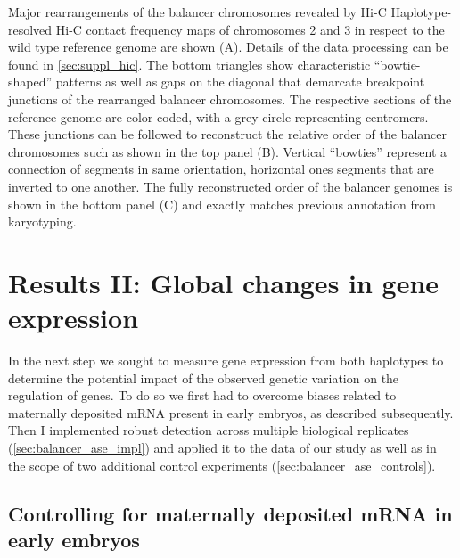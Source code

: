     {Major rearrangements of the balancer chromosomes revealed by Hi-C}{
    Haplotype-resolved Hi-C contact frequency maps of chromosomes 2 and 3 in
    respect to the wild type reference genome are shown (A). Details of the data
    processing can be found in \cref{sec:suppl_hic}. The bottom triangles show
    characteristic ``bowtie-shaped'' patterns as well as gaps on the diagonal
    that demarcate breakpoint junctions of the rearranged balancer chromosomes.
    The respective sections of the reference genome are color-coded, with a grey
    circle representing centromers.
    These junctions can be followed to reconstruct the relative order of the
    balancer chromosomes such as shown in the top panel (B). Vertical ``bowties''
    represent a connection of segments in same orientation, horizontal
    ones segments that are inverted to one another.
    The fully reconstructed order of the balancer genomes is shown in the bottom
    panel (C) and exactly matches previous annotation from
    karyotyping.}
\FloatBarrier












\section{Results II: Global changes in gene expression}
\label{sec:balancer_ase}

In the next step we sought to measure gene expression from both haplotypes to
determine the potential impact of the observed genetic variation on the
regulation of genes. To do so we first had to overcome biases related to
maternally deposited mRNA present in early embryos, as described subsequently.
Then I implemented robust \ase detection across multiple biological replicates
(\cref{sec:balancer_ase_impl}) and applied it to the data of our study as well
as in the scope of two additional control experiments
(\cref{sec:balancer_ase_controls}).




\subsection{Controlling for maternally deposited mRNA in early embryos}
\label{sec:balancer_maternal_rna}

